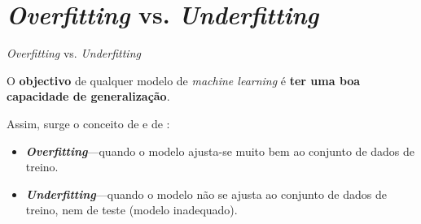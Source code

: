 \section{\textit{Overfitting} vs. \textit{Underfitting}}

\begin{frame}{\textit{Overfitting} vs. \textit{Underfitting}}
    
    O \textbf{objectivo} de qualquer modelo de \textit{machine learning} é \textbf{ter uma boa capacidade de generalização}.
    
    \pauseskip
    
    Assim, surge o conceito de  e de :
    \begin{itemize}
        \item \textbf{\textit{Overfitting}}---quando o modelo ajusta-se muito bem ao conjunto de dados de treino.
        \medskip
        \item \textbf{\textit{Underfitting}}---quando o modelo não se ajusta ao conjunto de dados de treino, nem de teste (modelo inadequado).
    \end{itemize}
    
    \medskip
    

\end{frame}
